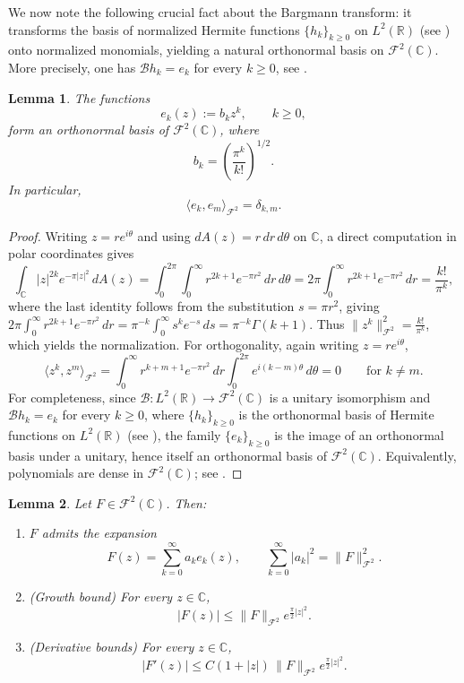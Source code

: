 \documentclass[a4paper,11pt,reqno]{amsart}
\numberwithin{equation}{section}
\theoremstyle{plain} %
\newtheorem{lemma}{Lemma}[section]
\theoremstyle{definition} %
\theoremstyle{remark}
\newcommand{\R}{\mathbb{R}}
\newcommand{\C}{\mathbb{C}}
\begin{document}
\medskip

We now note the following crucial fact about the Bargmann transform: it
transforms the basis of normalized Hermite functions \(\{h_k\}_{k\geq 0}\) on
\(L^2(\R)\) (see \cite{Thangavelu}) onto normalized monomials, yielding a
natural orthonormal basis on $\mathcal{F}^2(\C).$ More precisely, one has
\(\mathcal B h_k=e_k\) for every \(k\ge 0\), see \cite{Bargmann,Folland,Grochenig}.

\begin{lemma}\label{lem:monomials}
The functions
\[
e_k(z) := b_k z^k, \qquad k \ge 0,
\]
form an orthonormal basis of $\mathcal{F}^2(\mathbb{C})$, where
\[
b_k = \left( \frac{\pi^k}{k!} \right)^{1/2}.
\]
In particular,
\[
\langle e_k, e_m \rangle_{\mathcal{F}^2} = \delta_{k,m}.
\]
\end{lemma}

\begin{proof}
Writing \(z=re^{i\theta}\) and using \(dA(z)=r\,dr\,d\theta\) on \(\C\),
a direct computation in polar coordinates gives
\[
\int_{\mathbb{C}} |z|^{2k} e^{-\pi |z|^2}\,dA(z)
= \int_0^{2\pi}\!\!\int_0^\infty r^{2k+1} e^{-\pi r^2}\,dr\,d\theta
= 2\pi \int_0^\infty r^{2k+1} e^{-\pi r^2}\,dr
= \frac{k!}{\pi^k},
\]
where the last identity follows from the substitution \(s=\pi r^2\), giving
\(2\pi\int_0^\infty r^{2k+1}e^{-\pi r^2}\,dr=\pi^{-k}\int_0^\infty s^k e^{-s}\,ds
=\pi^{-k}\Gamma(k+1)\). Thus
\(\|z^k\|_{\mathcal{F}^2}^2 = \frac{k!}{\pi^k}\), which yields the normalization.
For orthogonality, again writing \(z=re^{i\theta}\),
\[
\langle z^k,z^m\rangle_{\mathcal F^2}
=
\int_0^\infty r^{k+m+1}e^{-\pi r^2}\,dr\int_0^{2\pi}e^{i(k-m)\theta}\,d\theta
=
0
\qquad\text{for }k\neq m.
\]
For completeness, since \(\mathcal B\colon L^2(\R)\to \mathcal F^2(\C)\) is a
unitary isomorphism and \(\mathcal Bh_k=e_k\) for every \(k\ge 0\), where
\(\{h_k\}_{k\ge 0}\) is the orthonormal basis of Hermite functions on
\(L^2(\R)\) (see \cite{Thangavelu}), the family \(\{e_k\}_{k\ge 0}\) is the
image of an orthonormal basis under a unitary, hence itself an orthonormal
basis of \(\mathcal F^2(\C)\). Equivalently, polynomials are dense in
\(\mathcal F^2(\C)\); see \cite{Bargmann,Zhu}.
\end{proof}

\medskip

\begin{lemma}\label{lem:growth}
Let $F \in \mathcal{F}^2(\mathbb{C})$. Then:
\begin{enumerate}
\item[(i)] $F$ admits the expansion
\[
F(z) = \sum_{k=0}^\infty a_k e_k(z),
\qquad \sum_{k=0}^\infty |a_k|^2 = \|F\|_{\mathcal{F}^2}^2.
\]

\item[(ii)] (Growth bound) For every $z \in \mathbb{C}$,
\[
|F(z)| \le \|F\|_{\mathcal{F}^2} e^{\frac{\pi}{2}|z|^2}.
\]

\item[(iii)] (Derivative bounds) For every $z \in \mathbb{C}$,
\[
|F'(z)| \le C(1+|z|)\, \|F\|_{\mathcal{F}^2} e^{\frac{\pi}{2}|z|^2}.
\]
\end{enumerate}
\end{lemma}
\end{document}
